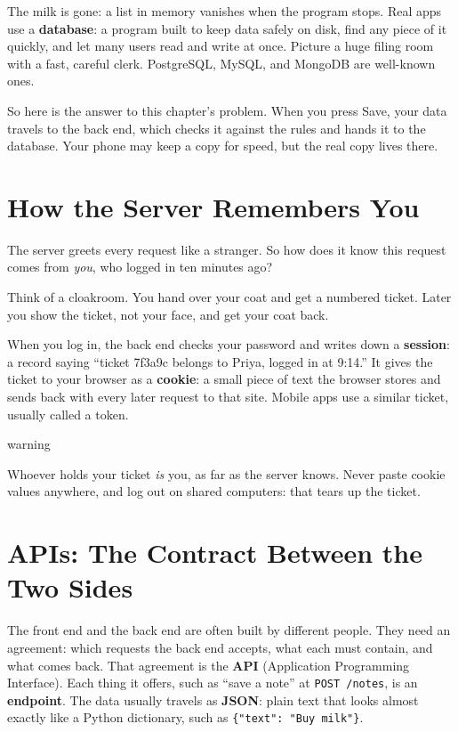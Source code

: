 The milk is gone: a list in memory vanishes when the program stops. Real apps use a \textbf{database}: a program built to keep data safely on disk, find any piece of it quickly, and let many users read and write at once. Picture a huge filing room with a fast, careful clerk. PostgreSQL, MySQL, and MongoDB are well-known ones.

So here is the answer to this chapter's problem. When you press Save, your data travels to the back end, which checks it against the rules and hands it to the database. Your phone may keep a copy for speed, but the real copy lives there.

\section{How the Server Remembers You}\label{03-the-back-end:how-the-server-remembers-you}

The server greets every request like a stranger. So how does it know this request comes from \emph{you}, who logged in ten minutes ago?

Think of a cloakroom. You hand over your coat and get a numbered ticket. Later you show the ticket, not your face, and get your coat back.

When you log in, the back end checks your password and writes down a \textbf{session}: a record saying ``ticket 7f3a9c belongs to Priya, logged in at 9:14.'' It gives the ticket to your browser as a \textbf{cookie}: a small piece of text the browser stores and sends back with every later request to that site. Mobile apps use a similar ticket, usually called a token.

\begin{callout}{warning}

Whoever holds your ticket \emph{is} you, as far as the server knows. Never paste cookie values anywhere, and log out on shared computers: that tears up the ticket.

\end{callout}

\section{APIs: The Contract Between the Two Sides}\label{03-the-back-end:apis-the-contract-between-the-two-sides}

The front end and the back end are often built by different people. They need an agreement: which requests the back end accepts, what each must contain, and what comes back. That agreement is the \textbf{API} (Application Programming Interface). Each thing it offers, such as ``save a note'' at \texttt{POST\ /notes}, is an \textbf{endpoint}. The data usually travels as \textbf{JSON}: plain text that looks almost exactly like a Python dictionary, such as \texttt{\{"text":\ "Buy\ milk"\}}.

